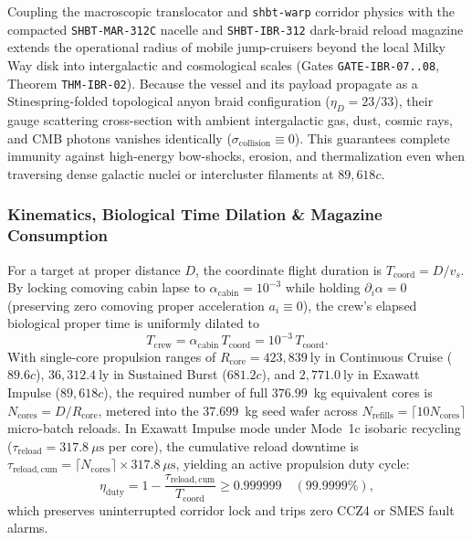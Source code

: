 \documentclass[11pt,onecolumn]{article}
\begin{document}
Coupling the macroscopic translocator and \texttt{shbt-warp} corridor physics with the compacted \texttt{SHBT-}\allowbreak\texttt{MAR-312C} nacelle and \texttt{SHBT-IBR-312} dark-braid reload magazine extends the operational radius of mobile jump-cruisers beyond the local Milky Way disk into intergalactic and cosmological scales (Gates \texttt{GATE-IBR-07..08}, Theorem \texttt{THM-IBR-02}). Because the vessel and its payload propagate as a Stinespring-folded topological anyon braid configuration ($\eta_D = 23/33$), their gauge scattering cross-section with ambient intergalactic gas, dust, cosmic rays, and CMB photons vanishes identically ($\sigma_{\mathrm{collision}} \equiv 0$). This guarantees complete immunity against high-energy bow-shocks, erosion, and thermalization even when traversing dense galactic nuclei or intercluster filaments at $89{,}618c$.

\subsubsection{Kinematics, Biological Time Dilation \& Magazine Consumption}
For a target at proper distance $D$, the coordinate flight duration is $T_{\mathrm{coord}} = D / v_s$. By locking comoving cabin lapse to $\alpha_{\mathrm{cabin}} = 10^{-3}$ while holding $\partial_i\alpha = 0$ (preserving zero comoving proper acceleration $a_i \equiv 0$), the crew's elapsed biological proper time is uniformly dilated to
\begin{equation}
  T_{\mathrm{crew}} = \alpha_{\mathrm{cabin}}\,T_{\mathrm{coord}} = 10^{-3}\,T_{\mathrm{coord}}.
  \label{eq:crew_proper_time_comp}
\end{equation}
With single-core propulsion ranges of $R_{\mathrm{core}} = 423{,}839~\mathrm{ly}$ in Continuous Cruise ($89.6c$), $36{,}312.4~\mathrm{ly}$ in Sustained Burst ($681.2c$), and $2{,}771.0~\mathrm{ly}$ in Exawatt Impulse ($89{,}618c$), the required number of full $376.99$~kg equivalent cores is $N_{\mathrm{cores}} = D / R_{\mathrm{core}}$, metered into the $37.699$~kg seed wafer across $N_{\mathrm{refills}} = \lceil 10 N_{\mathrm{cores}} \rceil$ micro-batch reloads. In Exawatt Impulse mode under Mode~1c isobaric recycling ($\tau_{\mathrm{reload}} = 317.8~\mu\mathrm{s}$ per core), the cumulative reload downtime is $\tau_{\mathrm{reload,cum}} = \lceil N_{\mathrm{cores}} \rceil \times 317.8~\mu\mathrm{s}$, yielding an active propulsion duty cycle:
\begin{equation}
  \eta_{\mathrm{duty}} = 1 - \frac{\tau_{\mathrm{reload,cum}}}{T_{\mathrm{coord}}} \ge 0.999999\quad(99.9999\%),
  \label{eq:duty_cycle_intergalactic}
\end{equation}
which preserves uninterrupted corridor lock and trips zero CCZ4 or SMES fault alarms.
\end{document}
